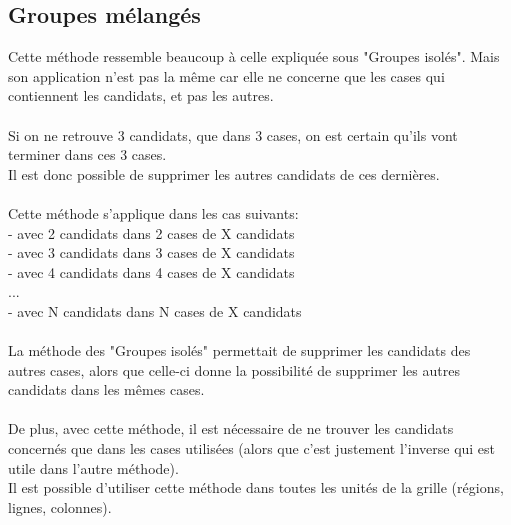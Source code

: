 \subsection{Groupes mélangés}
Cette méthode ressemble beaucoup à celle expliquée sous "Groupes isolés". 
Mais son application n'est pas la même car elle ne concerne que les cases qui contiennent les candidats, 
et pas les autres.\\
\\

Si on ne retrouve 3 candidats, que dans 3 cases, on est certain qu'ils vont terminer dans ces 3 cases.\\ 
Il est donc possible de supprimer les autres candidats de ces dernières.\\
\\
Cette méthode s'applique dans les cas suivants:\\
- avec 2 candidats dans 2 cases de X candidats\\
- avec 3 candidats dans 3 cases de X candidats\\
- avec 4 candidats dans 4 cases de X candidats\\
...\\
- avec N candidats dans N cases de X candidats\\
\\
La méthode des "Groupes isolés" permettait de supprimer les candidats des autres cases, 
alors que celle-ci donne la possibilité de supprimer les autres candidats dans les mêmes cases.\\
\\
De plus, avec cette méthode, il est nécessaire de ne trouver les candidats concernés que dans 
les cases utilisées (alors que c'est justement l'inverse qui est utile dans l'autre méthode).\\
Il est possible d'utiliser cette méthode dans toutes les unités de la grille (régions, lignes, colonnes).




